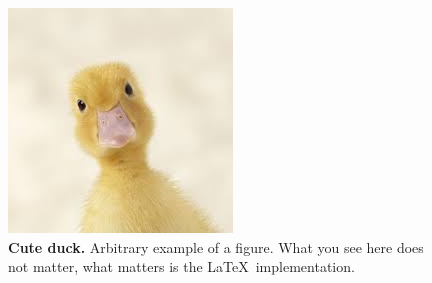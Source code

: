 \begin{figure}[ht]
\begin{center}
\includegraphics[scale=1.0]{./images/cute_duck.jpg}
\caption{{\bf Cute duck.} Arbitrary example of a figure. What you see here does not matter, what matters is the \LaTeX\ implementation. \setlength{\baselineskip}{1.25em}}
\label{fig_cute_duck}
\end{center}
\end{figure}